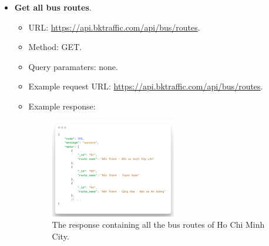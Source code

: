 \begin{itemize}
    \item \textbf{Get all bus routes}.
    \begin{itemize}
        \item URL: \url{https://api.bktraffic.com/api/bus/routes}.
        \item Method: GET.
        \item Query paramaters: none.
        \item Example request URL: \url{https://api.bktraffic.com/api/bus/routes}.
        \item Example response:
        \begin{figure}[H]
            \centering
            \includegraphics[width=0.55\textwidth]{assets/images/Implementation/all_routes_response.png}
            \caption{The response containing all the bus routes of Ho Chi Minh City.}
            \label{fig:all_routes_response}
        \end{figure}
    \end{itemize}


\end{itemize}
